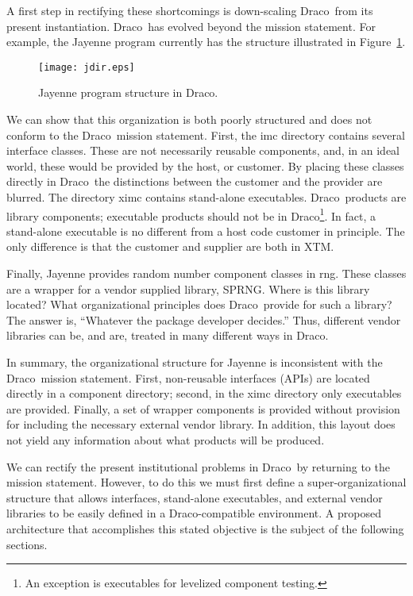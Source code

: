 \documentclass[11pt]{rnote}
\newcommand{\draco}{\textsf{Draco}}
\newcommand{\pkg}[1]{\textsf{#1}}
\begin{document}
A first step in rectifying these shortcomings is down-scaling \draco\ 
from its present instantiation.  \draco\ has evolved beyond the
mission statement.  For example, the \pkg{Jayenne} program currently
has the structure illustrated in Figure~\ref{fig:Jayenne}.
\begin{figure}
  \centerline{\texttt{[image: jdir.eps]}}
  \caption{\pkg{Jayenne} program structure in \draco.}
  \label{fig:Jayenne}
\end{figure}
We can show that this organization is both poorly structured and does
not conform to the \draco\ mission statement.  First, the \pkg{imc}
directory contains several interface classes.  These are not
necessarily reusable components, and, in an ideal world, these would
be provided by the host, or customer.  By placing these classes
directly in \draco\ the distinctions between the customer and the
provider are blurred.  The directory \pkg{ximc} contains stand-alone
executables.  \draco\ products are library components; executable
products should not be in \draco\footnote{An exception is executables
  for levelized component testing.}.  In fact, a stand-alone
executable is no different from a host code customer in principle.
The only difference is that the customer and supplier are both in XTM.

Finally, \pkg{Jayenne} provides random number component classes in
\pkg{rng}.  These classes are a wrapper for a vendor supplied library,
\pkg{SPRNG}.  Where is this library located?  What organizational
principles does \draco\ provide for such a library?  The answer is,
``Whatever the package developer decides.''  Thus, different vendor
libraries can be, and are, treated in many different ways in \draco.

In summary, the organizational structure for \pkg{Jayenne} is
inconsistent with the \draco\ mission statement.  First, non-reusable
interfaces (APIs) are located directly in a component directory;
second, in the \pkg{ximc} directory only executables are provided.
Finally, a set of wrapper components is provided without provision for
including the necessary external vendor library.  In addition,
this layout does not yield any information about what products will
be produced.

We can rectify the present institutional problems in \draco\ by
returning to the mission statement.  However, to do this we must first 
define a super-organizational structure that allows interfaces,
stand-alone executables, and external vendor libraries to be easily
defined in a \draco-compatible environment.  A proposed architecture
that accomplishes this stated objective is the subject of the
following sections.
\end{document}
